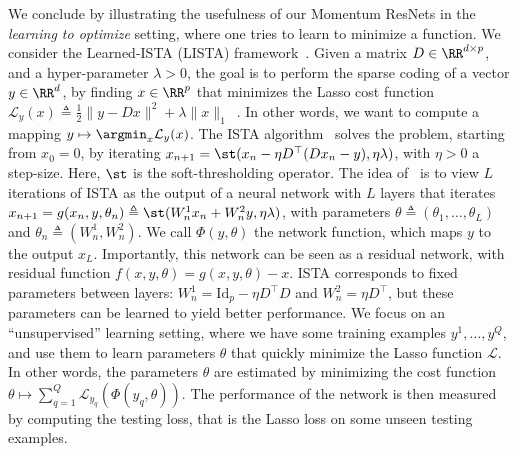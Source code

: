 \documentclass{article}
\begin{document}
We conclude by illustrating the usefulness of our Momentum ResNets in the \emph{learning to optimize} setting, where one tries to learn to minimize a function.
We consider the Learned-ISTA (LISTA) framework~\citep{gregor2010learning}. Given a matrix $D\in \RR^{d\times p}$, and a hyper-parameter $\lambda>0$, the goal is to perform the sparse coding of a vector $y\in \RR^d$, by finding $x\in\RR^p$ that minimizes the Lasso cost function $\mathcal{L}_y(x) \triangleq \frac12 \|y - Dx\|^2 + \lambda \|x\|_1$~\citep{tibshirani1996regression}.
In other words, we want to compute a mapping $y \mapsto \argmin_x \mathcal{L}_y(x)$.
The ISTA algorithm~\citep{daubechies2004iterative} solves the problem, starting from $x_0 = 0$, by iterating $x_{n+1} = \st(x_n - \eta D^{\top}(Dx_n - y), \eta \lambda)$, with $\eta >0$ a step-size.
Here, $\st$ is the soft-thresholding operator.
The idea of~\citet{gregor2010learning} is to view $L$ iterations of ISTA as the output of a neural network with $L$ layers that iterates $x_{n+1} = g(x_n, y, \theta_n)\triangleq \st(W^1_nx_n + W^2_ny, \eta\lambda)$, with parameters $\theta \triangleq (\theta_1, \dots, \theta_L)$ and $\theta_n \triangleq (W^1_n, W^2_n)$. 
We call $\Phi(y, \theta)$ the network function, which maps $y$ to the output $x_L$.
Importantly, this network can be seen as a residual network, with residual function $f(x, y, \theta) = g(x, y, \theta) - x$.
ISTA corresponds to fixed parameters between layers: $W^1_n = \mathrm{Id}_p - \eta D^{\top}D$ and $W^2_n = \eta D^ {\top}$, but these parameters can be learned to yield better performance.
We focus on an ``unsupervised'' learning setting, where we have some training examples $y^1, \dots, y^Q$, and use them to learn parameters $\theta$ that quickly minimize the Lasso function $\mathcal{L}$. In other words, the parameters $\theta$ are estimated by minimizing the cost function $\theta \mapsto \sum_{q=1}^Q\mathcal{L}_{y_q}(\Phi(y_q, \theta))$.
The performance of the network is then measured by computing the testing loss, that is the Lasso loss on some unseen testing examples.
\end{document}
